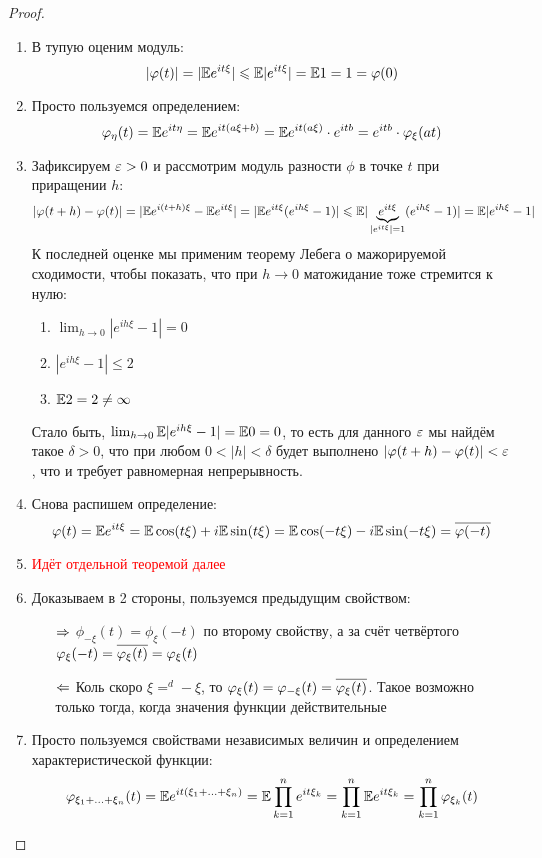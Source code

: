 \begin{proof}~
	\begin{enumerate}
		\item В тупую оценим модуль:
		\[
			|\varphi(t)| = |\mathbb{E} e^{it\xi}| \leqslant \mathbb{E}|e^{it\xi}| = \mathbb{E} 1 = 1 = \varphi(0)
		\]
		
		\item Просто пользуемся определением:
		\[
			\varphi_\eta(t) = \mathbb{E} e^{it\eta} = \mathbb{E} e^{it(a\xi + b)} = \mathbb{E} e^{it(a\xi)} \cdot e^{itb} = e^{itb} \cdot \varphi_\xi(at)
		\]
		
		\item Зафиксируем $\varepsilon > 0$ и рассмотрим модуль разности $\phi$ в точке $t$ при приращении $h$:
		\[
			|\varphi(t + h) - \varphi(t)| = |\mathbb{E} e^{i(t + h)\xi} - \mathbb{E} e^{it\xi}| = |\mathbb{E} e^{it\xi}(e^{ih\xi} - 1)| \leqslant \mathbb{E} |\underbrace{e^{it\xi}}_{|e^{it\xi}| = 1} (e^{ih\xi} - 1)| = \mathbb{E}|e^{ih\xi} - 1|
		\]
		К последней оценке мы применим теорему Лебега о мажорируемой сходимости, чтобы показать, что при $h \to 0$ матожидание тоже стремится к нулю:
		\begin{enumerate}
			\item $\lim_{h \to 0} |e^{ih\xi} - 1| = 0$
			
			\item $|e^{ih\xi} - 1| \le 2$
			
			\item $\mathbb{E} 2 = 2 \neq \infty$
		\end{enumerate}
		Стало быть, $\lim_{h \to 0} \mathbb{E} |e^{ih\xi} - 1| = \mathbb{E} 0 = 0$, то есть для данного $\varepsilon$ мы найдём такое $\delta > 0$, что при любом $0 < |h| < \delta$ будет выполнено $|\varphi(t + h) - \varphi(t)| < \varepsilon$, что и требует равномерная непрерывность.
		
		\item Снова распишем определение:
		\[
			\varphi(t) = \mathbb{E} e^{it\xi} = \mathbb{E}\cos(t\xi) + i\mathbb{E}\sin(t\xi) = \mathbb{E}\cos(-t\xi) - i\mathbb{E}\sin(-t\xi) = \overline{\varphi(-t)}
		\]
		
		\item \textcolor{red}{Идёт отдельной теоремой далее}
		
		\item Доказываем в 2 стороны, пользуемся предыдущим свойством:
		\begin{itemize}
			\item[$\Rightarrow$] \(\phi_{-\xi}(t) = \phi_\xi(-t)\) по второму свойству, а за счёт четвёртого $\varphi_\xi(-t) = \overline{\varphi_\xi(t)} = \varphi_\xi(t)$
			
			\item[$\Leftarrow$] Коль скоро $\xi =^d -\xi$, то $\varphi_\xi(t) = \varphi_{-\xi}(t) = \overline{\varphi_\xi(t)}$. Такое возможно только тогда, когда значения функции действительные
		\end{itemize}
	
		\item Просто пользуемся свойствами независимых величин и определением характеристической функции:
		\[
			\varphi_{\xi_1 + \ldots + \xi_n}(t) = \mathbb{E} e^{it(\xi_1 + \ldots + \xi_n)} = \mathbb{E} \prod_{k = 1}^n e^{it\xi_k} = \prod_{k = 1}^n \mathbb{E} e^{it\xi_k} = \prod_{k = 1}^n \varphi_{\xi_k}(t)
		\]
	\end{enumerate}
\end{proof}

